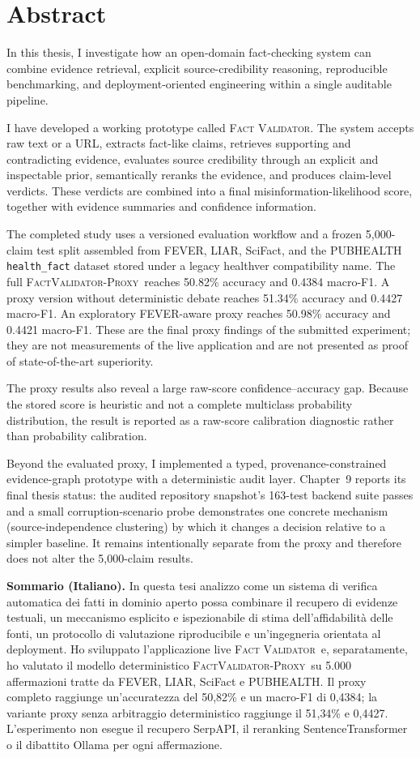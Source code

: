 \documentclass[12pt,a4paper,openany]{report}
\newcommand{\system}{\textsc{Fact Validator}}
\newcommand{\proxy}{\textsc{FactValidator-Proxy}}
\begin{document}
\chapter*{Abstract}
In this thesis, I investigate how an open-domain fact-checking system can combine evidence retrieval, explicit source-credibility reasoning, reproducible benchmarking, and deployment-oriented engineering within a single auditable pipeline.

I have developed a working prototype called \system. The system accepts raw text or a URL, extracts fact-like claims, retrieves supporting and contradicting evidence, evaluates source credibility through an explicit and inspectable prior, semantically reranks the evidence, and produces claim-level verdicts. These verdicts are combined into a final misinformation-likelihood score, together with evidence summaries and confidence information.

The completed study uses a versioned evaluation workflow and a frozen 5{,}000-claim test split assembled from FEVER, LIAR, SciFact, and the PUBHEALTH \texttt{health\_fact} dataset stored under a legacy healthver compatibility name. The full \proxy\ reaches 50.82\% accuracy and 0.4384 macro-F1. A proxy version without deterministic debate reaches 51.34\% accuracy and 0.4427 macro-F1. An exploratory FEVER-aware proxy reaches 50.98\% accuracy and 0.4421 macro-F1. These are the final proxy findings of the submitted experiment; they are not measurements of the live application and are not presented as proof of state-of-the-art superiority.

The proxy results also reveal a large raw-score confidence--accuracy gap. Because the stored score is heuristic and not a complete multiclass probability distribution, the result is reported as a raw-score calibration diagnostic rather than probability calibration.

Beyond the evaluated proxy, I implemented a typed, provenance-constrained evidence-graph prototype with a deterministic audit layer. Chapter~9 reports its final thesis status: the audited repository snapshot's 163-test backend suite passes and a small corruption-scenario probe demonstrates one concrete mechanism (source-independence clustering) by which it changes a decision relative to a simpler baseline. It remains intentionally separate from the proxy and therefore does not alter the 5{,}000-claim results.

\textbf{Sommario (Italiano).} In questa tesi analizzo come un sistema di verifica automatica dei fatti in dominio aperto possa combinare il recupero di evidenze testuali, un meccanismo esplicito e ispezionabile di stima dell'affidabilit\`a delle fonti, un protocollo di valutazione riproducibile e un'ingegneria orientata al deployment. Ho sviluppato l'applicazione live \system\ e, separatamente, ho valutato il modello deterministico \proxy\ su 5.000 affermazioni tratte da FEVER, LIAR, SciFact e PUBHEALTH. Il proxy completo raggiunge un'accuratezza del 50{,}82\% e un macro-F1 di 0{,}4384; la variante proxy senza arbitraggio deterministico raggiunge il 51{,}34\% e 0{,}4427. L'esperimento non esegue il recupero SerpAPI, il reranking SentenceTransformer o il dibattito Ollama per ogni affermazione.
\end{document}
